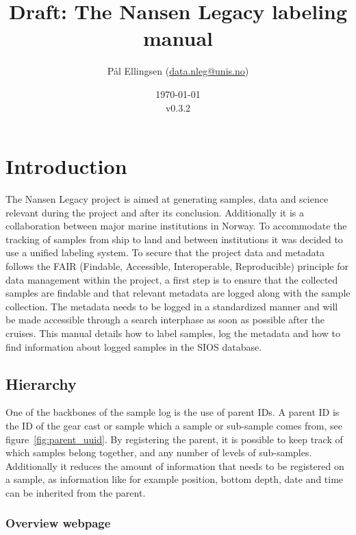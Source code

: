 \documentclass[a4paper,english, 11pt]{article}
\title{Draft: The Nansen Legacy labeling manual}
\date{\today\\v0.3.2}
\author{Pål Ellingsen (\url{data.nleg@unis.no})}
\begin{document}
\maketitle
\tableofcontents
\pagestyle{fancy}
\newpage
\section{Introduction} %
\label{sec:Introduction}

The Nansen Legacy project is aimed at generating samples, data and science relevant during the project and after its conclusion. Additionally it is a collaboration between major marine institutions in Norway. To accommodate the tracking of samples from ship to land and between institutions it was decided to use a unified labeling system. To secure that the project data and metadata follows the FAIR (Findable, Accessible, Interoperable, Reproducible) principle for data management within the project, a first step is to ensure that the collected samples are findable and that relevant metadata are logged
along with the sample collection. The metadata needs to be logged in a standardized manner and will be
made accessible through a search interphase as soon as possible after the cruises.  This manual details how to label samples, log the metadata and how to find information about logged samples in the SIOS database.  



\subsection{Hierarchy} %
\label{sub:Hirarcy}

One of the backbones of the sample log is the use of parent IDs. A parent ID is the ID of the gear cast or sample which a sample or sub-sample comes from, see figure~\ref{fig:parent_uuid}. By registering the parent, it is possible to keep track of which samples belong together, and any number of levels of sub-samples. Additionally it reduces the amount of information that needs to be registered on a sample, as information like for example position, bottom depth, date and time can be inherited from the parent. 

\subsubsection{Overview webpage} %
\label{ssub:Overview_webpage}
\end{document}
